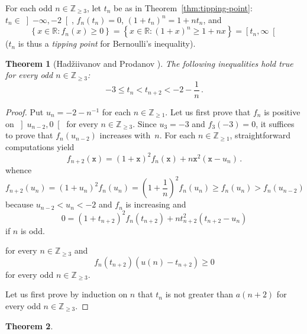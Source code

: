 \documentclass[12pt]{article}
\newcommand{\bZ}{\mathbb{Z}}
\newcommand{\bR}{\mathbb{R}}
\newcommand{\bN}[1]{\bZ_{\ge #1}}
\newcommand{\ttx}{\mathtt{x}}
\newtheorem{theorem}{Theorem}
\begin{document}
 For each odd $n \in \bN{3}$,
 let $t_n$ be as in Theorem~\ref{thm:tipping-point}:
 $t_n \in \left]- \infty, - 2 \right[$, $f_n(t_n) = 0$, ${(1 + t_n)}^n = 1 + n t_n$,
 and 
 $$
 \left\{ x \in \bR : f_n(x) \ge 0 \right\}
 = \left\{ x \in \bR : {(1 + x)}^n \ge 1 + n x  \right\}
 = \left[t_n, \infty \right[ 
 $$
 ($t_n$ is thus a \emph{tipping point} for Bernoulli's inequality).
  
 


 \begin{theorem} [Had\v{z}iivanov and Prodanov \cite{MitrinovicAI}] \label{thm:bulgare}
   The following inequalities hold true for every odd $n \in \bN{3}$:
   $$ - 3 \le t_n < t_{n + 2} < - 2 - \frac{1}{n} \,.
   $$
 \end{theorem}
 
 \begin{proof}
   Put $u_n = - 2 - n^{-1}$ for each $n \in \bN{1}$.
   Let us first prove that $f_n$ is positive on $\left]u_{n - 2}, 0 \right[$ for every $n \in \bN{3}$.
   Since $u_3 = - 3$ and $f_3(- 3) = 0$, it suffices to prove that $f_n(u_{n - 2})$ increases with~$n$.
   For each $n \in \bN{1}$, straightforward computations yield 
   $$
   f_{n + 2} (\ttx) = {(1 + \ttx)}^2 f_n(\ttx) + n \ttx^2 (\ttx - u_n) \,.
   $$
   whence
   $$
   f_{n + 2}(u_n)
   =
   {(1 + u_n )}^2 f_n(u_n)
   =
   {\left(1 + \frac{1}{n} \right)}^2 f_n(u_n)
   \ge
   f_n(u_n)
   >
   f_n(u_{n - 2})
   $$
   because $u_{n - 2} < u_n < - 2$ and $f_n$ is increasing 
   and
   $$
   0 = {(1 + t_{n + 2})}^2 f_n(t_{n + 2}) +  n t_{n + 2}^2 (t_{n + 2} - u_n)  
   $$
   if $n$ is odd.
   

   
   
 for every $n \in \bN{3}$ and
 $$
 f_n(t_{n + 2})  (u(n) - t_{n + 2})  \ge 0
 $$
 for every odd $n \in \bN{3}$.
 
   Let us first prove by induction on $n$ that $t_n$ is not greater than $a(n + 2)$ for every odd $n \in \bN{3}$.
   
 \end{proof}
 \begin{theorem}
   \label{lem:odd-two-roots}

 \end{theorem}
\end{document}

